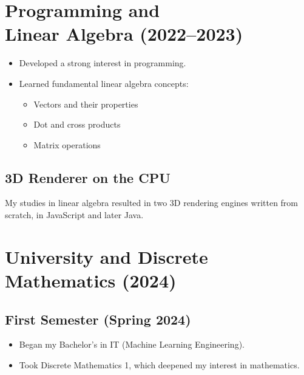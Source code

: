 \documentclass{article}
\begin{document}
\section[Programming and Linear Algebra (2022--2023)]{Programming and \\ Linear Algebra (2022--2023)}
\begin{itemize}
    \item Developed a strong interest in programming.
    \item Learned fundamental linear algebra concepts:
    \begin{itemize}
        \item Vectors and their properties
        \item Dot and cross products
        \item Matrix operations
    \end{itemize}
\end{itemize}
\subsection*{3D Renderer on the CPU}
My studies in linear algebra resulted in two 3D rendering engines written from scratch, in JavaScript and later Java.

\section{University and Discrete Mathematics (2024)}
\subsection{First Semester (Spring 2024)}
\begin{itemize}
    \item Began my Bachelor’s in IT (Machine Learning Engineering).
    \item Took Discrete Mathematics 1, which deepened my interest in mathematics.
\end{itemize}
\end{document}
